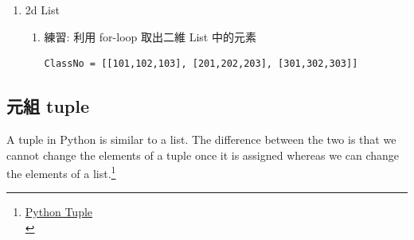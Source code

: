 \documentclass[a4paper,12pt]{article}
\begin{document}
\begin{enumerate}
\begin{enumerate}
\item removing the Nth occurence element
\label{sec:orgdec39cd}
\begin{itemize}
\item 讀入一字串\\
\item 再讀入一 word x, 一整數 n (n<字串長度)，刪除上述字串中第 n 個重複出現的 x\\
\item 輸出剩下的字串\\
\item Examples\\
\begin{verbatim}
Input: to be or not to be, that is the question.
       be
       2
Output: to be or not to, that is the question.
\end{verbatim}
\end{itemize}

\item Maximum Subarray
\label{sec:orgf8da6e8}
item description here\ldots{}\\
\end{enumerate}

\item 2d List
\label{sec:orga032132}
\begin{enumerate}
\item 練習: 利用 for-loop 取出二維 List 中的元素
\label{sec:org32d4180}
\lstset{breaklines=true,language=Python,label= ,caption= ,captionpos=b,firstnumber=1,numbers=left}
\begin{lstlisting}
ClassNo = [[101,102,103], [201,202,203], [301,302,303]]
\end{lstlisting}
\end{enumerate}
\end{enumerate}

\subsection{元組 tuple}
\label{sec:orge046d35}
A tuple in Python is similar to a list. The difference between the two is that we cannot change the elements of a tuple once it is assigned whereas we can change the elements of a list.\footnote{\href{https://www.programiz.com/python-programming/tuple}{Python Tuple}\\}\\
\end{document}
